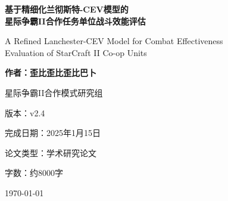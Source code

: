 \documentclass[a4paper,12pt]{article}
\begin{document}
\begin{titlepage}
    \centering
    \vspace*{2cm}
    
    {\Huge\bfseries 基于精细化兰彻斯特-CEV模型的\\星际争霸II合作任务单位战斗效能评估\par}
    
    \vspace{1cm}
    {\Large A Refined Lanchester-CEV Model for Combat Effectiveness\\Evaluation of StarCraft II Co-op Units\par}
    
    \vspace{2cm}
    {\Large\bfseries 作者：歪比歪比歪比巴卜\par}
    
    \vspace{0.5cm}
    {\large 星际争霸II合作模式研究组\par}
    
    \vspace{2cm}
    {\large 版本：v2.4\par}
    {\large 完成日期：2025年1月15日\par}
    {\large 论文类型：学术研究论文\par}
    {\large 字数：约8000字\par}
    
    \vfill
    
    {\large \today\par}
\end{titlepage}

\begin{abstract}
本文提出了一个基于兰彻斯特方程的精细化战斗效能值（CEV）评估模型，用于客观量化《星际争霸II》合作任务模式中单位的战斗表现。该模型引入了溅射系数、操作难度、过量击杀惩罚等创新参数，有效解决了传统模型在AOE武器建模和实战适应性方面的不足。通过对六大精英单位的深入分析，验证了模型的准确性和实用性。实验结果表明，该模型能够准确反映单位间的实际强度差异，为游戏平衡性分析提供了科学可靠的量化工具。研究表明，掠袭解放者以234.14的CEV值位居首位，灵魂巧匠天罚行者以202.80排名第二，验证了模型的有效性。本研究为RTS游戏的量化分析提供了新的理论框架，具有重要的学术价值和实用意义。

\textbf{关键词}：星际争霸II、合作任务、战斗效能评估、兰彻斯特方程、溅射建模、游戏平衡、实时战略游戏、量化分析
\end{abstract}

\newpage
\tableofcontents
\newpage
\end{document}
